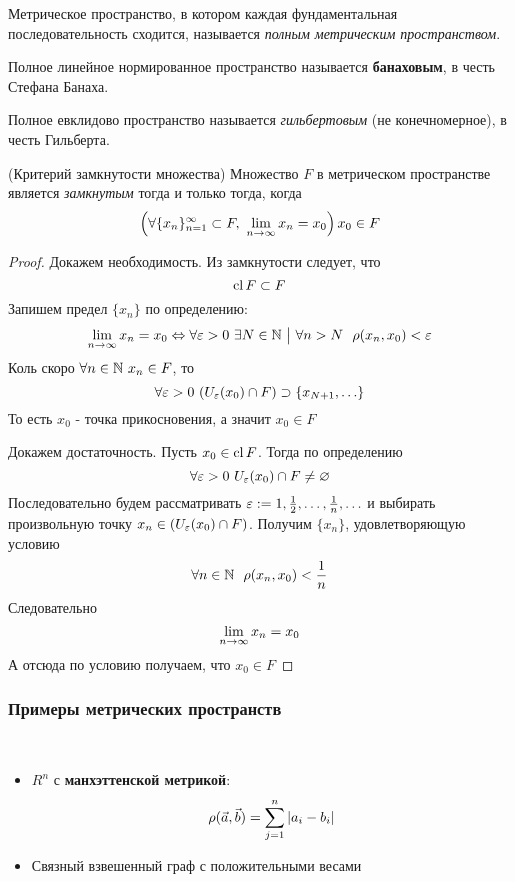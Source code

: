 \begin{definition}
	Метрическое пространство, в котором каждая фундаментальная последовательность сходится, называется \textit{полным метрическим пространством}.
	
	Полное линейное нормированное пространство называется \textbf{банаховым}, в честь Стефана Банаха.
	
	Полное евклидово пространство называется \textit{гильбертовым} (не конечномерное), в честь Гильберта.
\end{definition}

\begin{theorem} (Критерий замкнутости множества)
	Множество $F$ в метрическом пространстве является \textit{замкнутым} тогда и только тогда, когда
	\[
		\left(\forall \{x_n\}_{n = 1}^\infty \subset F,\ \lim\limits_{n \to \infty} x_n = x_0\right) x_0 \in F
	\]
\end{theorem}

\begin{proof}
	Докажем необходимость. Из замкнутости следует, что
	\[
		\operatorname{cl} F \subset F
	\]
	Запишем предел $\{x_n\}$ по определению:
	\[
		\liml_{n \to \infty} x_n = x_0 \lra \forall \eps > 0\ \exists N \in \N \such \forall n > N\ \ \rho(x_n, x_0) < \eps
	\]
	Коль скоро $\forall n \in \mathbb{N}\ x_n \in F$, то
	\[
		\forall \varepsilon > 0\ (U_\varepsilon(x_0) \cap F) \supset \{x_{N + 1}, \ldots\}
	\]
	То есть $x_0$ - точка прикосновения, а значит $x_0 \in F$
	
	Докажем достаточность. Пусть $x_0 \in \operatorname{cl} F$. Тогда по определению
	\[
		\forall \varepsilon > 0\ U_\varepsilon(x_0) \cap F \neq \varnothing
	\]
	Последовательно будем рассматривать $\varepsilon := 1, \frac{1}{2}, \ldots, \frac{1}{n}, \ldots$ и выбирать произвольную точку $x_n \in (U_\varepsilon(x_0) \cap F)$. Получим $\{x_n\}$, удовлетворяющую условию
	\[
		\forall n \in \N\ \ \rho(x_n, x_0) < \frac{1}{n}
	\]
	Следовательно
	\[
		\lim\limits_{n \to \infty} x_n = x_0
	\]
	А отсюда по условию получаем, что $x_0 \in F$
\end{proof}

\subsubsection*{Примеры метрических пространств}

\begin{example}~
\begin{itemize}
	\item $R^n$ с \textbf{манхэттенской метрикой}:
	\[
		\rho(\vec{a}, \vec{b}) = \sum\limits_{j = 1}^n |a_i - b_i|
	\]
	
	\item Связный взвешенный граф с положительными весами
\end{itemize}
\end{example}